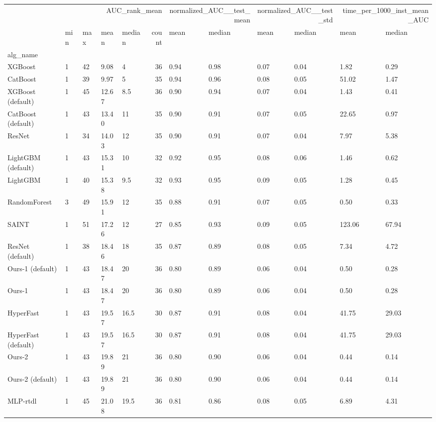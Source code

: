 \begin{tabular}{lllllrllllll}
\toprule
 & \multicolumn{5}{r}{AUC_rank_mean} & \multicolumn{2}{r}{normalized_AUC__test_mean} & \multicolumn{2}{r}{normalized_AUC__test_std} & \multicolumn{2}{r}{time_per_1000_inst_mean_AUC} \\
 & min & max & mean & median & count & mean & median & mean & median & mean & median \\
alg_name &  &  &  &  &  &  &  &  &  &  &  \\
\midrule
XGBoost & 1 & 42 & 9.08 & 4 & 36 & 0.94 & 0.98 & 0.07 & 0.04 & 1.82 & 0.29 \\
CatBoost & 1 & 39 & 9.97 & 5 & 35 & 0.94 & 0.96 & 0.08 & 0.05 & 51.02 & 1.47 \\
XGBoost (default) & 1 & 45 & 12.67 & 8.5 & 36 & 0.90 & 0.94 & 0.07 & 0.04 & 1.43 & 0.41 \\
CatBoost (default) & 1 & 43 & 13.40 & 11 & 35 & 0.90 & 0.91 & 0.07 & 0.05 & 22.65 & 0.97 \\
ResNet & 1 & 34 & 14.03 & 12 & 35 & 0.90 & 0.91 & 0.07 & 0.04 & 7.97 & 5.38 \\
LightGBM (default) & 1 & 43 & 15.31 & 10 & 32 & 0.92 & 0.95 & 0.08 & 0.06 & 1.46 & 0.62 \\
LightGBM & 1 & 40 & 15.38 & 9.5 & 32 & 0.93 & 0.95 & 0.09 & 0.05 & 1.28 & 0.45 \\
RandomForest & 3 & 49 & 15.91 & 12 & 35 & 0.88 & 0.91 & 0.07 & 0.05 & 0.50 & 0.33 \\
SAINT & 1 & 51 & 17.26 & 12 & 27 & 0.85 & 0.93 & 0.09 & 0.05 & 123.06 & 67.94 \\
ResNet (default) & 1 & 38 & 18.46 & 18 & 35 & 0.87 & 0.89 & 0.08 & 0.05 & 7.34 & 4.72 \\
Ours-1 (default) & 1 & 43 & 18.47 & 20 & 36 & 0.80 & 0.89 & 0.06 & 0.04 & 0.50 & 0.28 \\
Ours-1 & 1 & 43 & 18.47 & 20 & 36 & 0.80 & 0.89 & 0.06 & 0.04 & 0.50 & 0.28 \\
HyperFast & 1 & 43 & 19.57 & 16.5 & 30 & 0.87 & 0.91 & 0.08 & 0.04 & 41.75 & 29.03 \\
HyperFast (default) & 1 & 43 & 19.57 & 16.5 & 30 & 0.87 & 0.91 & 0.08 & 0.04 & 41.75 & 29.03 \\
Ours-2 & 1 & 43 & 19.89 & 21 & 36 & 0.80 & 0.90 & 0.06 & 0.04 & 0.44 & 0.14 \\
Ours-2 (default) & 1 & 43 & 19.89 & 21 & 36 & 0.80 & 0.90 & 0.06 & 0.04 & 0.44 & 0.14 \\
MLP-rtdl & 1 & 45 & 21.08 & 19.5 & 36 & 0.81 & 0.86 & 0.08 & 0.05 & 6.89 & 4.31 \\

\end{tabular}
